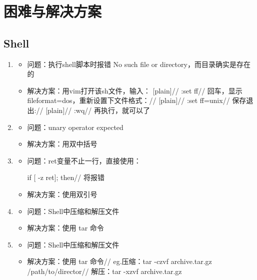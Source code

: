 \documentclass[UTF8]{ctexart}
\begin{document}
  \section{困难与解决方案}
  \subsection{Shell}
\begin{enumerate}
\item
\begin{itemize}
\item 问题：执行shell脚本时报错 No such file or directory，而目录确实是存在的
\item 解决方案：用vim打开该sh文件，输入：
[plain]//
:set ff//
回车，显示fileformat=dos，重新设置下文件格式：//
[plain]//
:set ff=unix//
保存退出://
[plain]//
:wq//
再执行，就可以了
\end{itemize}
\item
\begin{itemize}
\item 问题：unary operator expected
\item 解决方案：用双中括号
\end{itemize}
\item
\begin{itemize}
\item 问题：ret变量不止一行，直接使用：

if [ -z ret]; then//
将报错
\item 解决方案：使用双引号
\end{itemize}

\item
\begin{itemize}
\item 问题：Shell中压缩和解压文件

\item 解决方案：使用 tar 命令
\end{itemize}
\item
\begin{itemize}
\item 问题：Shell中压缩和解压文件

\item 解决方案：使用 tar 命令//
eg.压缩：tar -czvf archive.tar.gz /path/to/director//
解压：tar -xzvf archive.tar.gz
\end{itemize}
\end{enumerate}
\end{document}
